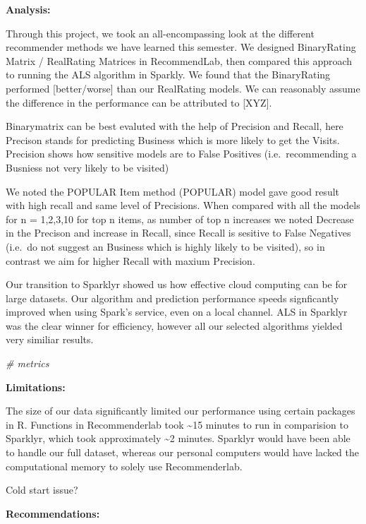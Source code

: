 \documentclass[]{article}
\newenvironment{Shaded}{\begin{snugshade}}{\end{snugshade}}
\newcommand{\CommentTok}[1]{\textcolor[rgb]{0.56,0.35,0.01}{\textit{#1}}}
\begin{document}
\textbf{Analysis:}

Through this project, we took an all-encompassing look at the different
recommender methods we have learned this semester. We designed
BinaryRating Matrix / RealRating Matrices in RecommendLab, then compared
this approach to running the ALS algorithm in Sparkly. We found that the
BinaryRating performed {[}better/worse{]} than our RealRating models. We
can reasonably assume the difference in the performance can be
attributed to {[}XYZ{]}.

Binarymatrix can be best evaluted with the help of Precision and Recall,
here Precison stands for predicting Business which is more likely to get
the Visits. Precision shows how sensitive models are to False Positives
(i.e.~recommending a Busniess not very likely to be visited)

We noted the POPULAR Item method (POPULAR) model gave good result with
high recall and same level of Precisions. When compared with all the
models for n = 1,2,3,10 for top n items, as number of top n increases we
noted Decrease in the Precison and increase in Recall, since Recall is
sesitive to False Negatives (i.e.~do not suggest an Business which is
highly likely to be visited), so in contrast we aim for higher Recall
with maxium Precision.

Our transition to Sparklyr showed us how effective cloud computing can
be for large datasets. Our algorithm and prediction performance speeds
signficantly improved when using Spark's service, even on a local
channel. ALS in Sparklyr was the clear winner for efficiency, however
all our selected algorithms yielded very similiar results.

\begin{Shaded}
\begin{Highlighting}[]
\CommentTok{# metrics}
\end{Highlighting}
\end{Shaded}

\textbf{Limitations:}

The size of our data significantly limited our performance using certain
packages in R. Functions in Recommenderlab took \textasciitilde{}15
minutes to run in comparision to Sparklyr, which took approximately
\textasciitilde{}2 minutes. Sparklyr would have been able to handle our
full dataset, whereas our personal computers would have lacked the
computational memory to solely use Recommenderlab.

Cold start issue?

\textbf{Recommendations:}
\end{document}
